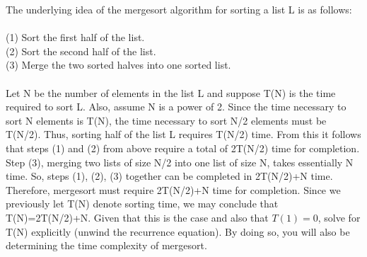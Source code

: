 The underlying idea of the mergesort algorithm for sorting a list L is as
follows:
\  \\
\  \\
\indent  (1) Sort the first half of the list.
\  \\
\indent  (2) Sort the second half of the list.
\  \\
\indent  (3) Merge the two sorted halves into one sorted list.
\  \\
\  \\
Let N be the number of elements in the list L and suppose T(N) is the time
required to sort L.  Also, assume N is a power of 2. Since the time necessary 
to sort N elements is T(N), the time necessary to sort N/2 elements must be 
T(N/2).  Thus, sorting half of the list L requires T(N/2) time.  From this it
follows that steps (1) and (2) from above require a total of 2T(N/2) time
for completion.  Step (3), merging two lists of size N/2 into one list of size
N, takes essentially N time.  So, steps (1), (2), (3) together can be
completed in 2T(N/2)+N time.  Therefore, mergesort must require 2T(N/2)+N
time for completion.  Since we previously let T(N) denote sorting time, we may
conclude that T(N)=2T(N/2)+N.  Given that this is the case and also that 
$T(1)=0$, solve for T(N)
explicitly (unwind the recurrence equation).  By doing so, you will also
be determining the time complexity of mergesort.







